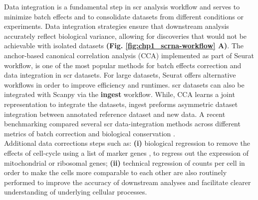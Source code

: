 \par Data integration is a fundamental step in \gls{scr} analysis workflow and serves to minimize batch effects and to consolidate datasets from different conditions or experiments. 
Data integration strategies ensure that downstream analysis accurately reflect biological variance, allowing for discoveries that would not be achievable with isolated datasets \textbf{(Fig. \ref{fig:chp1_scrna-workflow} A)}.  %
The anchor-based canonical correlation analysis (CCA) implemented as part of Seurat \textbf{\cite{stuart_comprehensive_2019}} workflow, is one of the most popular methods for batch effects correction and data integration in \gls{scr} datasets. For large datasets, Seurat offers alternative workflows in order to improve efficiency and runtimes. \gls{scr} datasets can also be integrated with Scanpy via the \textbf{ingest} workflow. %
While, CCA learns a joint representation to integrate the datasets, ingest preforms asymmetric dataset integration between annotated reference dataset and new data. A recent benchmarking compared several \gls{scr} data-integration methods across different metrics of batch correction and biological conservation \textbf{\cite{luecken_benchmarking_2021}}.\\

Additional data corrections steps such as: \textbf{(i)} biological regression to remove the effects of cell-cycle using a list of marker genes  \textbf{\cite{macosko_highly_2015}}, to regress out the expression of mitochondrial or ribosomal genes; \textbf{(ii)} technical regression of counts per cell in order to make the cells more comparable to each other are also routinely performed to improve the accuracy of downstream analyses and facilitate clearer understanding of underlying cellular processes. 

